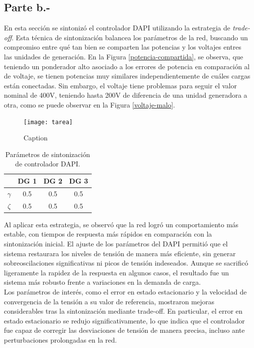 \subsection{Parte b.-}

En esta sección se sintonizó el controlador DAPI utilizando la estrategia de \textit{trade-off}. Esta técnica de sintonización balancea los parámetros de la red, buscando un compromiso entre qué tan bien se comparten las potencias y los voltajes entres las unidades de generación. En la Figura \ref{potencia-compartida}, se observa, que teniendo un ponderador alto asociado a los errores de potencia en comparación al de voltaje, se tienen potencias muy similares independientemente de cuáles cargas están conectadas. Sin embargo, el voltaje tiene problemas para seguir el valor nominal de 400V, teniendo hasta 200V de diferencia de una unidad generadora a otra, como se puede observar en la Figura \ref{voltaje-malo}.
\begin{figure}
    \centering
    \texttt{[image: tarea]}
    \caption{Caption}
    \label{fig:enter-label}
\end{figure}
\begin{table}[h!]
\centering
\begin{tabular}{|c|c|c|c|}
\hline
 & DG 1 & DG 2 & DG 3 \\ 
\hline
$\gamma$ & 0.5 & 0.5 & 0.5 \\ 
\hline
$\zeta$  & 0.5 & 0.5 & 0.5 \\ 
\hline
\end{tabular}
\caption{Parámetros de sintonización de controlador DAPI.}
\label{parametros_dapi}
\end{table}


Al aplicar esta estrategia, se observó que la red logró un comportamiento más estable, con tiempos de respuesta más rápidos en comparación con la sintonización inicial. El ajuste de los parámetros del DAPI permitió que el sistema restaurara los niveles de tensión de manera más eficiente, sin generar sobreoscilaciones significativas ni picos de tensión indeseados. Aunque se sacrificó ligeramente la rapidez de la respuesta en algunos casos, el resultado fue un sistema más robusto frente a variaciones en la demanda de carga.\\

Los parámetros de interés, como el error en estado estacionario y la velocidad de convergencia de la tensión a su valor de referencia, mostraron mejoras considerables tras la sintonización mediante trade-off. En particular, el error en estado estacionario se redujo significativamente, lo que indica que el controlador fue capaz de corregir las desviaciones de tensión de manera precisa, incluso ante perturbaciones prolongadas en la red.


